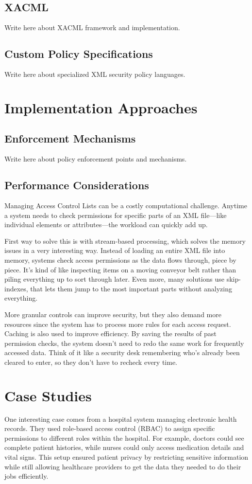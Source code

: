 \documentclass[runningheads]{llncs}
\begin{document}
\subsection{XACML}
Write here about XACML framework and implementation.

\subsection{Custom Policy Specifications}
Write here about specialized XML security policy languages.

\section{Implementation Approaches}

\subsection{Enforcement Mechanisms}
Write here about policy enforcement points and mechanisms.

\subsection{Performance Considerations}
Managing Access Control Lists can be a costly computational challenge. Anytime a system needs to check permissions for specific parts of an XML file—like individual elements or attributes—the workload can quickly add up.

First way to solve this is with stream-based processing, which solves the memory issues in a very interesting way. Instead of loading an entire XML file into memory, systems check access permissions as the data flows through, piece by piece. It’s kind of like inspecting items on a moving conveyor belt rather than piling everything up to sort through later. Even more, many solutions use skip-indexes, that lets them jump to the most important parts without analyzing everything.

More granular controls can improve security, but they also demand more resources since the system has to process more rules for each access request. Caching is also used to improve efficiency. By saving the results of past permission checks, the system doesn’t need to redo the same work for frequently accessed data. Think of it like a security desk remembering who’s already been cleared to enter, so they don’t have to recheck every time.

\section{Case Studies}
One interesting case comes from a hospital system managing electronic health records. They used role-based access control (RBAC) to assign specific permissions to different roles within the hospital. For example, doctors could see complete patient histories, while nurses could only access medication details and vital signs. This setup ensured patient privacy by restricting sensitive information while still allowing healthcare providers to get the data they needed to do their jobs efficiently.
\end{document}
